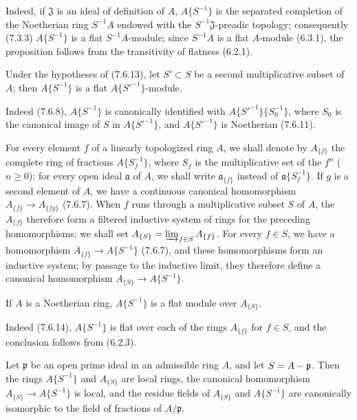 Indeed, if $\mathfrak J$ is an ideal of definition of $A$,
$A\{S^{-1}\}$ is the separated completion of the Noetherian ring $S^{-1}A$ endowed
with the $S^{-1}\mathfrak J$-preadic topology; consequently (7.3.3)
$A\{S^{-1}\}$ is a flat $S^{-1}A$-module; since $S^{-1}A$ is a
flat $A$-module (6.3.1), the proposition follows from the transitivity of
flatness (6.2.1).

\begin{corollary}[7.6.14]
\label{0.7.6.14}
Under the hypotheses of \textup{(7.6.13)}, let $S'\subset S$ be a second multiplicative
subset of $A$; then $A\{S^{-1}\}$ is a flat
$A\{{S'}^{-1}\}$-module.
\end{corollary}

Indeed (7.6.8), $A\{S^{-1}\}$ is canonically identified with
$A\{{S'}^{-1}\}\{S_0^{-1}\}$, where $S_0$ is the canonical image of $S$ in
$A\{{S'}^{-1}\}$, and $A\{{S'}^{-1}\}$ is Noetherian (7.6.11).

\begin{env}[7.6.15]
\label{0.7.6.15}
For every element $f$ of a linearly topologized ring $A$, we shall
denote by $A_{\{f\}}$ the complete ring of fractions $A\{S_f^{-1}\}$,
where $S_f$ is the multiplicative set of the $f^n$ ($n\geq 0$); for every
open ideal $\mathfrak a$ of $A$, we shall write $\mathfrak a_{\{f\}}$ instead
of $\mathfrak a\{S_f^{-1}\}$. If $g$ is a second element of $A$, we have
a continuous canonical homomorphism $A_{\{f\}}\to A_{\{fg\}}$ (7.6.7).
When $f$ runs through a multiplicative subset $S$ of $A$, the $A_{\{f\}}$
therefore form a filtered inductive system of rings for the preceding
homomorphisms; we shall set
$A_{\{S\}}=\varinjlim_{f\in S}A_{\{f\}}$. For every $f\in S$, we have a
homomorphism $A_{\{f\}}\to A\{S^{-1}\}$ (7.6.7), and
these homomorphisms form an inductive system; by passage to the inductive
limit, they therefore define a canonical homomorphism
$A_{\{S\}}\to A\{S^{-1}\}$.
\end{env}

\begin{proposition}[7.6.16]
\label{0.7.6.16}
If $A$ is a Noetherian ring, $A\{S^{-1}\}$ is a flat module over
$A_{\{S\}}$.
\end{proposition}

Indeed (7.6.14), $A\{S^{-1}\}$ is flat over each of the rings
$A_{\{f\}}$ for $f\in S$, and the conclusion follows from (6.2.3).

\begin{proposition}[7.6.17]
\label{0.7.6.17}
Let $\mathfrak p$ be an open prime ideal in an admissible ring $A$, and
let $S=A-\mathfrak p$. Then the rings $A\{S^{-1}\}$ and $A_{\{S\}}$ are
local rings, the canonical homomorphism
$A_{\{S\}}\to A\{S^{-1}\}$ is local, and the residue fields of $A_{\{S\}}$
and $A\{S^{-1}\}$ are canonically isomorphic to the field of fractions of
$A/\mathfrak p$.
\end{proposition}

